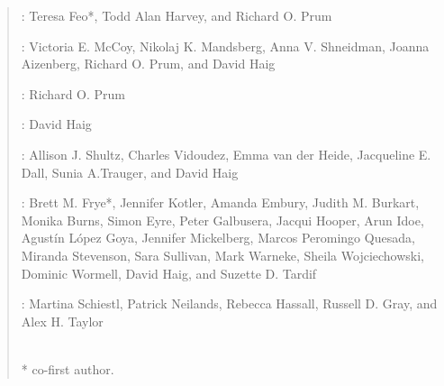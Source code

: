 
\vspace{5mm}
\begin{quote}
\newthought{\textcolor{SchoolColor}{Chapter 1}}: Teresa Feo*, Todd Alan Harvey, and Richard O. Prum

\newthought{\textcolor{SchoolColor}{Chapter 2}}:  Victoria E. McCoy, Nikolaj K. Mandsberg, Anna V. Shneidman, Joanna Aizenberg, Richard O. Prum, and David Haig

\newthought{\textcolor{SchoolColor}{Chapter 3}}:  Richard O. Prum

\newthought{\textcolor{SchoolColor}{Chapter 4}}:  David Haig

\newthought{\textcolor{SchoolColor}{Chapter 5}}:  Allison J. Shultz, Charles Vidoudez, Emma van der Heide, Jacqueline E. Dall, Sunia A.Trauger, and David Haig

\newthought{\textcolor{SchoolColor}{Chapter 6}}:  Brett M. Frye*, Jennifer Kotler, Amanda Embury, Judith M. Burkart, Monika Burns, Simon Eyre, Peter Galbusera, Jacqui Hooper, Arun Idoe, Agustín López Goya, Jennifer Mickelberg, Marcos Peromingo Quesada, Miranda Stevenson, Sara Sullivan, Mark Warneke, Sheila Wojciechowski, Dominic Wormell, David Haig, and Suzette D. Tardif

\newthought{\textcolor{SchoolColor}{Chapter 7}}:  Martina Schiestl, Patrick Neilands, Rebecca Hassall, Russell D. Gray, and Alex H. Taylor

\vspace{5mm}
\\
\hspace*{\fill}* co-first author.\quad
\end{quote}


